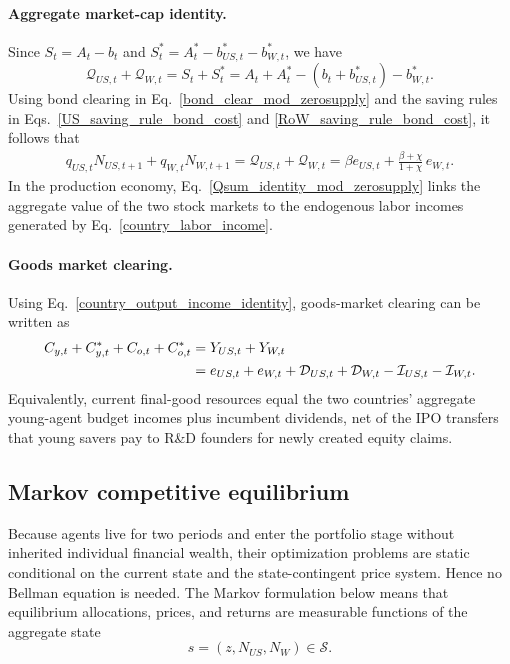 \documentclass{article}
\begin{document}
\paragraph{Aggregate market-cap identity.}
Since $S_t=A_t-b_t$ and $S_t^*=A_t^*-b_{US,t}^*-b_{W,t}^*$, we have
\[
\mathcal Q_{US,t}+\mathcal Q_{W,t}=S_t+S_t^*
=
A_t+A_t^*-(b_t+b_{US,t}^*)-b_{W,t}^*.
\]
Using bond clearing in Eq.~\eqref{bond_clear_mod_zerosupply} and the saving rules in Eqs.~\eqref{US_saving_rule_bond_cost} and \eqref{RoW_saving_rule_bond_cost}, it follows that
\begin{align}\label{Qsum_identity_mod_zerosupply}
\boxed{
q_{US,t}N_{US,t+1}+q_{W,t}N_{W,t+1}
=
\mathcal Q_{US,t}+\mathcal Q_{W,t}
=
\beta e_{US,t}
+\frac{\beta+\chi}{1+\chi}\,e_{W,t}.
}
\end{align}
In the production economy, Eq.~\eqref{Qsum_identity_mod_zerosupply} links the aggregate value of the two stock markets to the endogenous labor incomes generated by Eq.~\eqref{country_labor_income}.

\paragraph{Goods market clearing.}
Using Eq.~\eqref{country_output_income_identity}, goods-market clearing can be written as
\begin{align}\label{goods_clear_mod}
C_{y,t}+C^*_{y,t}+C_{o,t}+C^*_{o,t}
&=
Y_{US,t}+Y_{W,t}\notag\\
&=
e_{US,t}+e_{W,t}
+\mathcal D_{US,t}+\mathcal D_{W,t}
-\mathcal I_{US,t}-\mathcal I_{W,t}.
\end{align}
Equivalently, current final-good resources equal the two countries' aggregate young-agent budget incomes plus incumbent dividends, net of the IPO transfers that young savers pay to R\&D founders for newly created equity claims.

\subsection{\texorpdfstring{Markov competitive equilibrium}{Markov competitive equilibrium}}

Because agents live for two periods and enter the portfolio stage without inherited individual financial wealth, their optimization problems are static conditional on the current state and the state-contingent price system. Hence no Bellman equation is needed. The Markov formulation below means that equilibrium allocations, prices, and returns are measurable functions of the aggregate state
\[
s=(z,N_{US},N_W)\in\mathcal S.
\]
\end{document}
